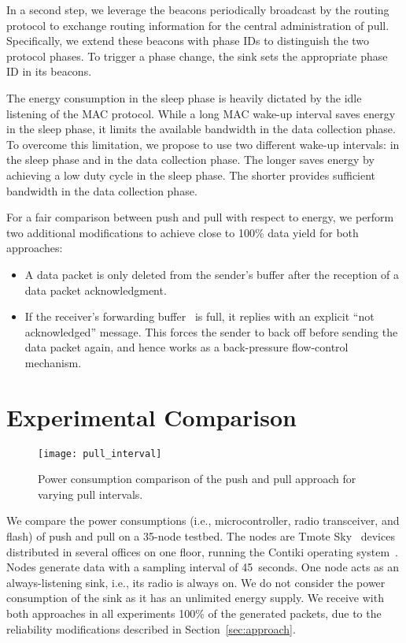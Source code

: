 \documentclass[10pt]{sensys-abstract}
\newcommand{\ie}{i.e.,\xspace}
\newcommand\secref[1]{Section~\ref{#1}}
\begin{document}
In a second step, we leverage the beacons periodically broadcast by the routing protocol to exchange routing information for the central administration of pull. Specifically, we extend these beacons with phase IDs to distinguish the two protocol phases. To trigger a phase change, the sink sets the appropriate phase ID in its beacons.

The energy consumption in the sleep phase is heavily dictated by the idle listening of the MAC protocol. While a long MAC wake-up interval  saves energy in the sleep phase, it limits the available bandwidth in the data collection phase. To overcome this limitation, we propose to use two different wake-up intervals:  in the sleep phase and  in the data collection phase. The longer  saves energy by achieving a low duty cycle in the sleep phase. The shorter  provides sufficient bandwidth in the data collection phase.

For a fair comparison between push and pull with respect to energy, we perform two additional modifications to achieve close to 100\% data yield for both approaches:
\begin{itemize}
 \item A data packet is only deleted from the sender's buffer after the reception of a data packet acknowledgment.
 \item If the receiver's forwarding buffer~\cite{Gnawali2009b} is full, it replies with an explicit ``not acknowledged'' message. This forces the sender to back off before sending the data packet again, and hence works as a back-pressure flow-control mechanism.
\end{itemize}

\section{Experimental Comparison}

\begin{figure}
 \centering
 \texttt{[image: pull\_interval]}
 \caption{Power consumption comparison of the push and pull approach for varying pull intervals.}
 \label{fig:pull_int}
\end{figure}

We compare the power consumptions (\ie microcontroller, radio transceiver, and flash) of push and pull on a 35-node testbed. The nodes are Tmote Sky~\cite{Polastre05} devices distributed in several offices on one floor, running the Contiki operating system~\cite{Dunkels2004}. Nodes generate data with a sampling interval of 45~seconds. One node acts as an always-listening sink, \ie its radio is always on. We do not consider the power consumption of the sink as it has an unlimited energy supply. We receive with both approaches in all experiments 100\% of the generated packets, due to the reliability modifications described in \secref{sec:approach}.
\end{document}
